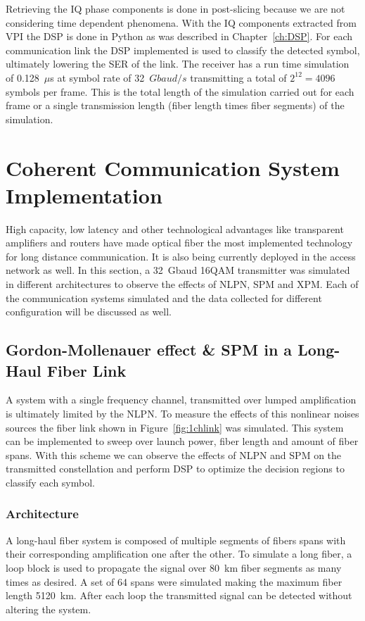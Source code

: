 Retrieving the IQ phase components is done in post-slicing because we are not considering time dependent phenomena. With the IQ components extracted from VPI the DSP is done in Python as was described in Chapter~\ref{ch:DSP}. For each communication link the DSP implemented is used to classify the detected symbol, ultimately lowering the SER of the link. The receiver has a run time simulation of 0.128~$\mu$s at symbol rate of 32~$Gbaud/s$ transmitting a total of $2^{12}=4096$ symbols per frame. This is the total length of the simulation carried out for each frame or a single transmission length (fiber length times fiber segments) of the simulation.


\section{Coherent Communication System Implementation}

High capacity, low latency and other technological advantages like transparent amplifiers and routers have made optical fiber the most implemented technology for long distance communication. It is also being currently deployed in the access network as well. In this section, a 32~Gbaud 16QAM transmitter was simulated in different architectures to observe the effects of NLPN, SPM and XPM. Each of the communication systems simulated and the data collected for different configuration will be discussed as well. 


\subsection{Gordon-Mollenauer effect \& SPM in a Long-Haul Fiber Link }
A system with a single frequency channel, transmitted over lumped amplification is ultimately limited by the NLPN. To measure the effects of this nonlinear noises sources the fiber link shown in Figure~\ref{fig:1chlink} was simulated. This system can be implemented to sweep over launch power, fiber length and amount of fiber spans. With this scheme we can observe the effects of NLPN and SPM on the transmitted constellation and perform DSP to optimize the decision regions to classify each symbol.


\subsubsection{Architecture}
A long-haul fiber system is composed of multiple segments of fibers spans with their corresponding amplification one after the other. To simulate a long fiber, a loop block is used to propagate the signal over 80~km fiber segments as many times as desired. A set of 64 spans were simulated making the maximum fiber length 5120~km. After each loop the transmitted signal can be detected without altering the system. 
 

